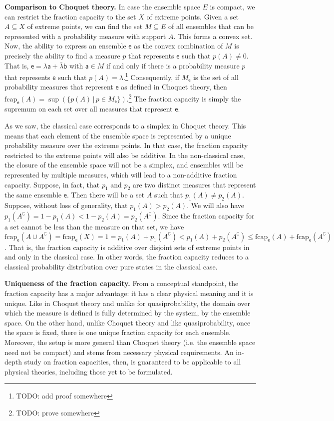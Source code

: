 \documentclass[10pt,twocolumn, nofootinbib]{revtex4-2}
\newcommand\frcap{\mathrm{fcap}}
\newcommand{\ens}[1][e] {\mathsf{#1}} %
\begin{document}
\textbf{Comparison to Choquet theory.} In case the ensemble space $E$ is compact, we can restrict the fraction capacity to the set $X$ of extreme points. Given a set $A \subseteq X$ of extreme points, we can find the set $M \subseteq E$ of all ensembles that can be represented with a probability measure with support $A$. This forms a convex set. Now, the ability to express an ensemble $\ens$ as the convex combination of $M$ is precisely the ability to find a measure $p$ that represents $\ens$ such that $p(A) \neq 0$. That is, $\ens = \lambda \ens[a] + \bar{\lambda} \ens[b]$ with $\ens[a] \in M$ if and only if there is a probability measure $p$ that represents $\ens$ such that $p(A) = \lambda$.\footnote{TODO: add proof somewhere} Consequently, if $M_{\ens}$ is the set of all probability measures that represent $\ens$ as defined in Choquet theory, then $\frcap_{\ens}(A) = \sup(\{p(A) \, | \, p \in M_{\ens}\})$.\footnote{TODO: prove somewhere} The fraction capacity is simply the supremum on each set over all measures that represent $\ens$.

As we saw, the classical case corresponds to a simplex in Choquet theory. This means that each element of the ensemble space is represented by a unique probability measure over the extreme points. In that case, the fraction capacity restricted to the extreme points will also be additive. In the non-classical case, the closure of the ensemble space will not be a simplex, and ensembles will be represented by multiple measures, which will lead to a non-additive fraction capacity. Suppose, in fact, that $p_1$ and $p_2$ are two distinct measures that represent the same ensemble $\ens$. Then there will be a set $A$ such that $p_1(A) \neq p_2(A)$. Suppose, without loss of generality, that $p_1(A) > p_2(A)$. We will also have $p_1(A^{\complement}) = 1- p_1(A) < 1 - p_2(A) = p_2(A^{\complement})$. Since the fraction capacity for a set cannot be less than the measure on that set, we have $\frcap_{\ens}(A \cup A^{\complement})=\frcap_{\ens}(X) = 1 = p_1(A) + p_1(A^{\complement}) < p_1(A) + p_2(A^{\complement}) \leq \frcap_{\ens}(A) + \frcap_{\ens}(A^{\complement})$. That is, the fraction capacity is additive over disjoint sets of extreme points in and only in the classical case. In other words, the fraction capacity reduces to a classical probability distribution over pure states in the classical case.

\textbf{Uniqueness of the fraction capacity.} From a conceptual standpoint, the fraction capacity has a major advantage: it has a clear physical meaning and it is unique. Like in Choquet theory and unlike for quasiprobability, the domain over which the measure is defined is fully determined by the system, by the ensemble space. On the other hand, unlike Choquet theory and like quasiprobability, once the space is fixed, there is one unique fraction capacity for each ensemble. Moreover, the setup is more general than Choquet theory (i.e. the ensemble space need not be compact) and stems from necessary physical requirements. An in-depth study on fraction capacities, then, is guaranteed to be applicable to all physical theories, including those yet to be formulated.
\end{document}
